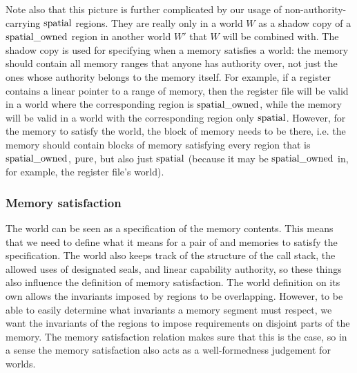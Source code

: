 \begin{jversion}
Note also that this picture is further complicated by our usage of non-authority-carrying $\mathrm{spatial}$ regions.
They are really only in a world $W$ as a shadow copy of a $\mathrm{spatial\_owned}$ region in another world $W'$ that $W$ will be combined with.
The shadow copy is used for specifying when a memory satisfies a world: the memory should contain all memory ranges that anyone has authority over, not just the ones whose authority belongs to the memory itself.
For example, if a register contains a linear pointer to a range of memory, then the register file will be valid in a world where the corresponding region is $\mathrm{spatial\_owned}$, while the memory will be valid in a world with the corresponding region only $\mathrm{spatial}$.
However, for the memory to satisfy the world, the block of memory needs to be there, i.e. the memory should contain blocks of memory satisfying every region that is $\mathrm{spatial\_owned}$, $\mathrm{pure}$, but also just $\mathrm{spatial}$ (because it may be $\mathrm{spatial\_owned}$ in, for example, the register file's world).

\subsubsection{Memory satisfaction}
\label{subsubsec:mem-sat}
The world can be seen as a specification of the memory contents.
This means that we need to define what it means for a pair of \trgcm{} and \srccm{} memories to satisfy the specification.
The world also keeps track of the structure of the call stack, the allowed uses of designated seals, and linear capability authority, so these things also influence the definition of memory satisfaction.
The world definition on its own allows the invariants imposed by regions to be overlapping.
However, to be able to easily determine what invariants a memory segment must respect, we want the invariants of the regions to impose requirements on disjoint parts of the memory.
The memory satisfaction relation makes sure that this is the case, so in a sense the memory satisfaction also acts as a well-formedness judgement for worlds.



\end{jversion}
